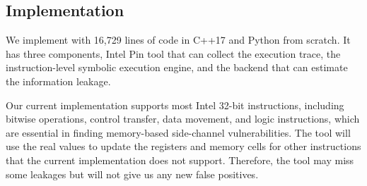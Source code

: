 \subsection{Implementation}
We implement \tool{} with 16,729 lines of code in C++17 and Python from scratch. It has three
components, Intel Pin tool that can collect the execution trace, the
instruction-level symbolic execution engine, and the backend that can estimate
the information leakage. 


Our current implementation supports most Intel 32-bit instructions,
including bitwise operations, control transfer, data movement, and logic
instructions, which are essential in finding memory-based side-channel
vulnerabilities. The tool will use the real values to update the registers and memory
cells for other instructions that the current implementation does not support. 
Therefore, the tool may miss some leakages but will not give us any new false positives. 
